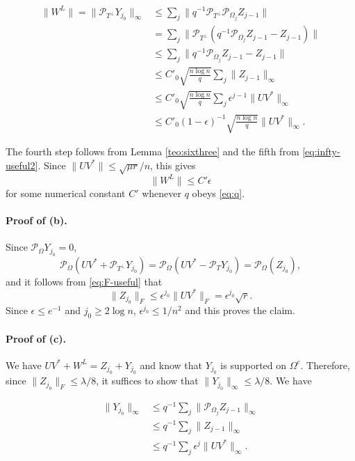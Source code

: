 \begin{align*}
  \|W^L\| = \|\mathcal{P}_{T^\perp} Y_{j_0}\|_\infty &
  \le \sum_j  \|q^{-1} \mathcal{P}_{T^\perp} \mathcal{P}_{\Omega_j} Z_{j-1}\|\\
  & = \sum_j  \|\mathcal{P}_{T^\perp} (q^{-1} \mathcal{P}_{\Omega_j} Z_{j-1} - Z_{j-1})\|\\
  & \le \sum_j \|q^{-1} \mathcal{P}_{\Omega_j} Z_{j-1} - Z_{j-1}\|\\
  & \le C'_0 \sqrt{\frac{n\log n}{q}} \sum_j \|Z_{j-1}\|_\infty\\
  & \le C'_0 \sqrt{\frac{n\log n}{q}} \sum_j \epsilon^{j-1} \|UV^*\|_\infty\\
  & \le C'_0 (1-\epsilon)^{-1} \sqrt{\frac{n \log n}{q}}
  \|UV^*\|_\infty.
\end{align*}

The fourth step follows from Lemma \ref{teo:sixthree} and the fifth from \eqref{eq:infty-useful2}. Since $\|UV^*\| \le \sqrt{\mu r}/{n}$, this gives
\[
\|W^L\| \le C' \epsilon
\] 
for some numerical constant $C'$ whenever $q$ obeys
\eqref{eq:q}. 

\paragraph{Proof of (b).} Since $\mathcal{P}_{\Omega} Y_{j_0} = 0$, 
\[
\mathcal{P}_{\Omega}(UV^* + \mathcal{P}_{T^\perp} Y_{j_0}) = \mathcal{P}_{\Omega}(UV^* - \mathcal{P}_T Y_{j_0}) = \mathcal{P}_{\Omega}(Z_{j_0}),   
\]
and it follows from \eqref{eq:F-useful} that
\[
\|Z_{j_0} \|_F \le \epsilon^{{j_0}} \|UV^*\|_F = \epsilon^{{j_0}} \sqrt{r}.  
\]
Since $\epsilon \le e^{-1}$ and $j_0 \ge 2\log n$, $\epsilon^{{j_0}}
\le 1/n^2$ and this proves the claim.

\paragraph{Proof of (c).} We have $UV^* + W^L = Z_{j_0} + Y_{j_0}$ and know that $Y_{j_0}$ is supported on $\Omega^c$.  Therefore, since
$\|Z_{j_0}\|_F \le \lambda/8$, it suffices to show that
$\|Y_{j_0}\|_\infty \le \lambda/8$. We have

\begin{align*}
  \|Y_{j_0}\|_\infty & \le  q^{-1} \sum_j  \|\mathcal{P}_{\Omega_j} Z_{j-1}\|_\infty \\
  & \le q^{-1} \sum_j \|Z_{j-1}\|_\infty\\
  & \le q^{-1} \sum_j \epsilon^j \|UV^*\|_\infty.
\end{align*}


